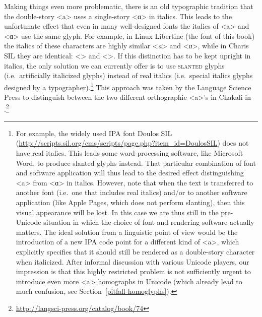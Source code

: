 Making things even more problematic, there is an old typographic tradition that
the double-story <a> uses a single-story <ɑ> in italics. This leads to the
unfortunate effect that even in many well-designed fonts the italics of <a> and
<ɑ> use the same glyph. For example, in Linux Libertine (the font of this book)
the italics of these characters are highly similar <\textit{a}> and
<\textit{ɑ}>, while in Charis SIL they are identical: <\textit{}> and
<\textit{}>. If this distinction has to be kept upright in italics,
the only solution we can currently offer is to use \textsc{slanted} glyphs
(i.e.~artificially italicized glyphs) instead of real italics (i.e.~special
italics glyphs designed by a typographer).\footnote{For example, the widely used
IPA font Doulos SIL
(\url{http://scripts.sil.org/cms/scripts/page.php?item\_id=DoulosSIL}) does not
have real italics. This leads some word-processing software, like Microsoft
Word, to produce slanted glyphs instead. That particular combination of font and
software application will thus lead to the desired effect distinguishing <a>
from <ɑ> in italics. However, note that when the text is transferred to another
font (i.e.~one that includes real italics) and/or to another software
application (like Apple Pages, which does not perform slanting), then this
visual appearance will be lost. In this case we are thus still in the
pre-Unicode situation in which the choice of font and rendering software
actually matters. The ideal solution from a linguistic point of view would be
the introduction of a new IPA code point for a different kind of <a>, which
explicitly specifies that it should still be rendered as a double-story
character when italicized. After informal discussion with various Unicode
players, our impression is that this highly restricted problem is not
sufficiently urgent to introduce even more <a> homographs in Unicode (which
already lead to much confusion, see Section~\ref{pitfall-homoglyphs}).} This 
approach was taken by the Language Science Press to distinguish 
between the two different orthographic <a>'s in Chakali in 
\cite{Brindle2017}.\footnote{\url{http://langsci-press.org/catalog/book/74}}

